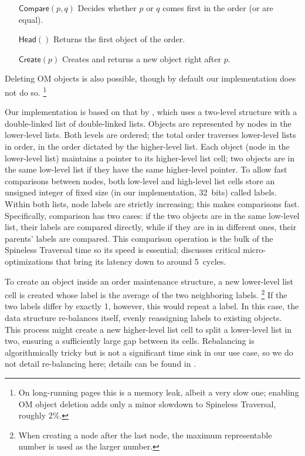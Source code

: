 \begin{enumerate}
\setlength{\itemindent}{8em}
  
\item[$\mathsf{Compare}(p, q)$] Decides whether $p$ or $q$ comes first in the order (or are equal).
\item[$\mathsf{Head}()$] Returns the first object of the order.
\item[$\mathsf{Create}(p)$] Creates and returns a new object right after $p$.
\end{enumerate}

\noindent
Deleting OM objects is also possible, though by default
  our implementation does not do so.%
\footnote{On long-running pages this is a memory leak,
  albeit a very slow one;
  enabling OM object deletion adds
  only a minor slowdown to Spineless Traversal,
  roughly 2\%.}

Our implementation is based on that by \citet{SOM},
  which uses a two-level structure with
  a double-linked list of double-linked lists.
Objects are represented by nodes in the lower-level lists.
Both levels are ordered;
  the total order traverses lower-level lists in order,
  in the order dictated by the higher-level list.
Each object (node in the lower-level list)
  maintains a pointer to its higher-level list cell;
  two objects are in the same low-level list
  if they have the same higher-level pointer.
To allow fast comparisons between nodes,
  both low-level and high-level list cells store
  an unsigned integer of fixed size
  (in our implementation, 32~bits)
  called labels.
Within both lists, node labels are strictly increasing;
  this makes comparisons fast.
Specifically, comparison has two cases:
  if the two objects are in the same low-level list,
  their labels are compared directly,
  while if they are in in different ones,
  their parents' labels are compared.
This comparison operation is
  the bulk of the Spineless Traversal time
  so its speed is essential;
   discusses critical micro-optimizations
  that bring its latency down to around 5~cycles.

To create an object inside an order maintenance structure,
  a new lower-level list cell is created
  whose label is the average of the two neighboring labels.%
\footnote{
  When creating a node after the last node,
  the maximum representable number is used as the larger number.
}
If the two labels differ by exactly 1, however,
  this would repeat a label.
In this case, the data structure re-balances itself,
  evenly reassigning labels to existing objects.
This process might
  create a new higher-level list cell
  to split a lower-level list in two,
  ensuring a sufficiently large gap between its cells.
Rebalancing is algorithmically tricky
  but is not a significant time sink in our use case,
  so we do not detail re-balancing here;
  details can be found in \citet{SOM}.

